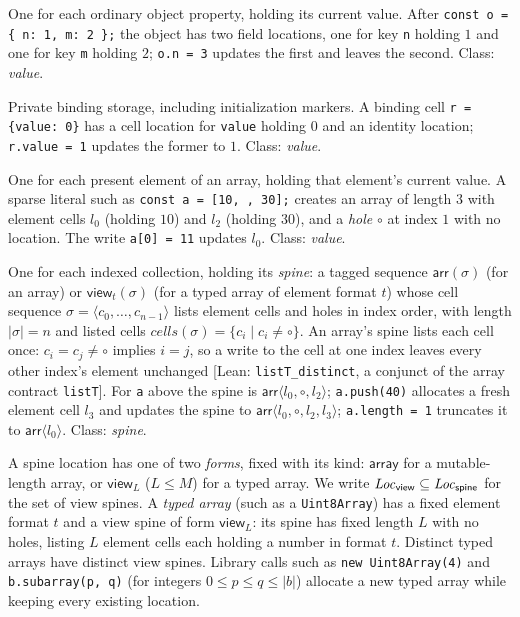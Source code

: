 \documentclass[10pt,a4paper]{article}
\theoremstyle{definition}
\theoremstyle{remark}
\newcommand{\LV}{\mathit{Loc}_{\mathsf{view}}}
\newcommand{\len}[1]{|#1|}
\newcommand{\code}[1]{\texttt{#1}}
\newcommand{\kF}{\mathsf{field}}\newcommand{\kC}{\mathsf{cell}}\newcommand{\kE}{\mathsf{elem}}\newcommand{\kS}{\mathsf{spine}}\newcommand{\kI}{\mathsf{id}}
\newcommand{\lean}[1]{\texttt{\small #1}}
\newcommand{\status}[1]{\textsf{\small[#1]}}
\begin{document}
\begin{description}[leftmargin=1.5em,style=nextline]
\item[Field location, kind $\kF$] One for each ordinary object property,
holding its current value. After \code{const o = \{ n: 1, m: 2 \};} the
object has two field locations, one for key \code{n} holding $1$ and one
for key \code{m} holding $2$; \code{o.n = 3} updates the first and
leaves the second. Class: \emph{value}.
\item[Cell location, kind $\kC$] Private binding storage, including
initialization markers. A binding cell \code{r = \{value: 0\}} has a
cell location for \code{value} holding $0$ and an identity location;
\code{r.value = 1} updates the former to $1$. Class: \emph{value}.
\item[Element cell, kind $\kE$] One for each present element of an
array, holding that element's current value. A sparse literal such as
\code{const a = [10, , 30];} creates an array of length $3$ with element
cells $l_0$ (holding $10$) and $l_2$ (holding $30$), and a \emph{hole}
$\circ$ at index $1$ with no location. The write \code{a[0] = 11}
updates $l_0$. Class: \emph{value}.
\item[Spine location, kind $\kS$] One for each indexed collection,
holding its \emph{spine}: a tagged sequence $\mathsf{arr}(\sigma)$ (for an
array) or $\mathsf{view}_t(\sigma)$ (for a typed array of element format
$t$) whose cell sequence $\sigma=\langle c_0,\ldots,c_{n-1}\rangle$
lists element cells and holes in index order, with length $\len\sigma=n$
and listed cells $\mathit{cells}(\sigma)=\{c_i\mid c_i\ne\circ\}$. An
array's spine lists each cell once: $c_i=c_j\ne\circ$ implies $i=j$, so a
write to the cell at one index leaves every other index's element
unchanged
\status{Lean: \lean{listT\_distinct}, a conjunct of the array contract \lean{listT}}. For
\code{a} above the spine is $\mathsf{arr}\langle l_0,\circ,l_2\rangle$;
\code{a.push(40)} allocates a fresh element cell $l_3$ and updates the
spine to $\mathsf{arr}\langle l_0,\circ,l_2,l_3\rangle$; \code{a.length = 1}
truncates it to $\mathsf{arr}\langle l_0\rangle$. Class: \emph{spine}.

A spine location has one of two \emph{forms}, fixed with its kind:
$\mathsf{array}$ for a mutable-length array, or $\mathsf{view}_L$
($L\le M$) for a typed array. We write $\LV\subseteq\LS$ for the set of
view spines. A \emph{typed array} (such as a \code{Uint8Array}) has a
fixed element format $t$ and a view spine of form $\mathsf{view}_L$: its
spine has fixed length $L$ with no holes, listing $L$ element cells each
holding a number in format $t$. Distinct typed arrays have distinct view
spines. Library calls such as \code{new Uint8Array(4)} and
\code{b.subarray(p, q)} (for integers $0\le p\le q\le\len b$) allocate a
new typed array while keeping every existing location.


\end{description}
\end{document}
